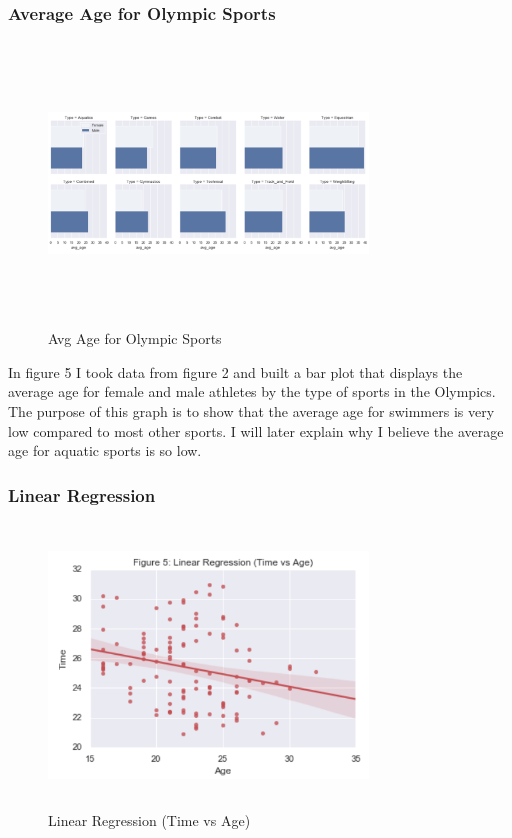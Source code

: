 \documentclass[letterpaper, 10 pt, conference]{ieeeconf}  %
\begin{document}
\subsubsection{Average Age for Olympic Sports}
\begin{figure}
    \centering
    \includegraphics[width=8.5cm, height=7.5cm]{Avg_Age_for_Olympians.png}
    \caption{Avg Age for Olympic Sports}
    \label{Fig 5}
\end{figure}

In figure 5 I took data from figure 2 and built a bar plot that displays the average age for female and male athletes by the type of sports in the Olympics. The purpose of this graph is to show that the average age for swimmers is very low compared to most other sports. I will later explain why I believe the average age for aquatic sports is so low.  

\subsubsection{Linear Regression}
\begin{figure}
    \centering
    \includegraphics[width=8.5cm, height=7.5cm]{LinearReg.png}
    \caption{Linear Regression (Time vs Age)}
    \label{Fig 6}
\end{figure}
\end{document}
